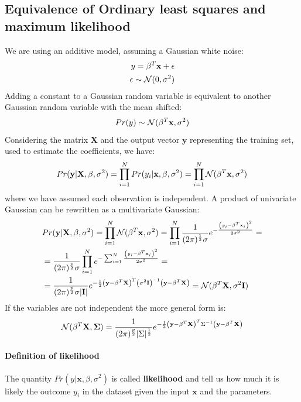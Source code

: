 \documentclass[12pt, letterpaper]{article}
\theoremstyle{definition}
\newcommand{\X}{\mathrm{\mathbf{X}}}
\newcommand{\y}{\mathbf{y}}
\newcommand{\x}{\mathbf{x}}
\begin{document}
\subsection{Equivalence of Ordinary least squares and maximum likelihood}
We are using an additive model, assuming a Gaussian white noise:
\begin{align}
y = \beta^T \x + \epsilon \\
\epsilon \sim \CMcal{N}(0,\sigma^2)
\end{align}
Adding a constant to a Gaussian random variable is equivalent to another Gaussian random variable with the mean shifted:
\begin{equation}
Pr(y) \sim \CMcal{N}(\beta^T \x ,\sigma^2)
\end{equation}
Considering the matrix $\X$ and the output vector $\y$ representing the training set, used to estimate the coefficients, we have:
\begin{equation}
Pr(\y|\X, \beta, \sigma^2)  = \prod_{i=1}^N Pr(y_i|\x, \beta, \sigma^2) =  \prod_{i=1}^N \CMcal{N}(\beta^T \x ,\sigma^2)
\end{equation}
where we have assumed each observation is independent. A product of univariate Gaussian can be rewritten as a multivariate Gaussian:
\begin{equation}
\label{multiGauss}
\begin{aligned}
 &Pr(\y|\X, \beta, \sigma^2)  = \prod_{i=1}^N \CMcal{N}(\beta^T \x ,\sigma^2) =  \prod_{i=1}^N \frac{1}{(2\pi)^{\frac{1}{2}}\sigma}e^{-\frac{\left(y_i-\beta^T\x_i\right)^2} {2\sigma^2}}= \\
 &= \frac{1}{(2\pi)^{\frac{p}{2}}\sigma}\prod_{i=1}^N e^{-\sum_{i=1}^N \frac{\left(y_i-\beta^T\x_i\right)^2} {2\sigma^2}} = \\
 &=  \frac{1}{(2\pi)^{\frac{p}{2}}\sigma|\mathbf{I}|}e^{-\frac{1}{2}\left(\y-\beta^T\X\right)^T\left(\sigma^2 \mathbf{I}\right)^{-1}\left(\y-\beta^T\X\right)} = \CMcal{N}(\beta^T \X ,\sigma^2\mathbf{I}) 
\end{aligned}
\end{equation}
If the variables are not independent the more general form is:
\begin{equation}
\CMcal{N}(\beta^T \X ,\mathbf{\Sigma}) =\frac{1}{(2\pi)^{\frac{p}{2}}|\Sigma|^\frac{1}{2}}e^{-\frac{1}{2}\left(\y-\beta^T\X\right)^T\Sigma^{-1}\left(\y-\beta^T\X\right)}
\end{equation}

\paragraph{Definition of likelihood}
The quantity $Pr(y|\x, \beta, \sigma^2)$ is called \textbf{likelihood} and tell us how much it is likely the outcome $y_i$ in the dataset given the input $\x$ and the parameters.
\end{document}
